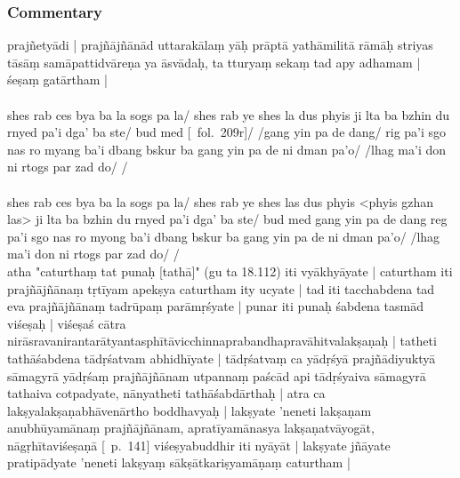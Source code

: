 \documentclass[12pt]{article}
\begin{document}
\subsubsection{Commentary}
prajñetyādi | prajñājñānād uttarakālaṃ yāḥ prāptā yathāmilitā rāmāḥ striyas tāsāṃ samāpattidvāreṇa ya āsvādaḥ, ta tturyaṃ sekaṃ tad apy adhamam | śeṣaṃ gatārtham |\\

\textbf{\TVA}\\
shes rab ces bya ba la sogs pa la/ shes rab ye shes la dus phyis ji lta ba bzhin du rnyed pa'i dga' ba ste/ bud med [\TVA\ fol.\ 209r]/ /gang yin pa de dang/ rig pa'i sgo nas ro myang ba'i dbang bskur ba gang yin pa de ni dman pa'o/ /lhag ma'i don ni rtogs par zad do/ /\\

\textbf{\TVB}\\
shes rab ces bya ba la sogs pa la/ shes rab ye shes las dus phyis <phyis gzhan las> ji lta ba bzhin du rnyed pa'i dga' ba ste/ bud med gang yin pa de dang reg pa'i sgo nas ro myong ba'i dbang bskur ba gang yin pa de ni dman pa'o/ /lhag ma'i don ni rtogs par zad do/ /\\

atha "caturthaṃ tat punaḥ [tathā]" (gu ta 18.112) iti vyākhyāyate | caturtham iti prajñājñānaṃ tṛtīyam apekṣya caturtham ity ucyate | tad iti tacchabdena tad eva prajñājñānaṃ tadrūpaṃ parāmṛśyate | punar iti punaḥ śabdena tasmād viśeṣaḥ | viśeṣaś cātra nirāsravanirantarātyantasphītāvicchinnaprabandhapravāhitvalakṣaṇaḥ | tatheti tathāśabdena tādṛśatvam abhidhīyate | tādṛśatvaṃ ca yādṛśyā prajñādiyuktyā sāmagyrā yādṛśaṃ prajñājñānam utpannaṃ paścād api tādṛśyaiva sāmagyrā tathaiva cotpadyate, nānyatheti tathāśabdārthaḥ | atra ca lakṣyalakṣaṇabhāvenārtho boddhavyaḥ | lakṣyate 'neneti lakṣaṇam anubhūyamānaṃ prajñājñānam, apratīyamānasya lakṣaṇatvāyogāt, nāgṛhītaviśeṣaṇā [\EDD\ p.\ 141] viśeṣyabuddhir iti nyāyāt | lakṣyate jñāyate pratipādyate 'neneti lakṣyaṃ sākṣātkariṣyamāṇaṃ caturtham |\\
\end{document}
